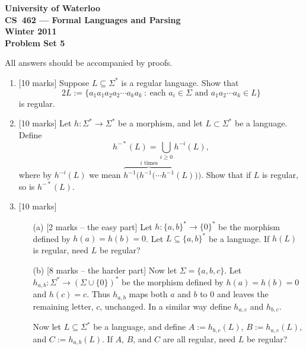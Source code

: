 \documentclass[12pt]{article}
\begin{document}
\begin{center}
\large\bf University of Waterloo\\
CS~462 --- Formal Languages and Parsing\\
Winter 2011\\
Problem Set 5\\
\end{center}

\bigskip


\smallskip


\bigskip\bigskip

All answers should be accompanied by proofs.

\begin{enumerate}

\item{} [10 marks]
Suppose $L \subseteq \Sigma^*$ is a regular language.  Show that
$$2L := \lbrace a_1 a_1 a_2 a_2 \cdots a_k a_k \ : \ 
\text{each $a_i \in \Sigma$ and $a_1 a_2 \cdots a_k \in L$} \rbrace$$
is regular.

\item{} [10 marks] Let $h: \Sigma^* \rightarrow \Sigma^*$ be a morphism,
and let $L \subset \Sigma^*$ be a language.  Define
$$h^{-*} (L) = \bigcup_{i \geq 0} h^{-i} (L),$$
where by $h^{-i}(L)$ we mean $\overbrace{h^{-1} ( h^{-1} ( \cdots h^{-1}}^{i
 \text{ times}} (L)))$.
Show that if $L$ is regular, so is $h^{-*} (L)$.

\item{} [10 marks]
\begin{itemize}
\item[(a)]  [2 marks -- the easy part]
Let $h: \lbrace a,b \rbrace^* \rightarrow \lbrace 0 \rbrace^*$
be the morphism defined by $h(a) = h(b) = 0$.
Let $L \subseteq \lbrace a,b \rbrace^*$ be a language.
If $h(L)$ is regular, need
$L$ be regular?  

\item[(b)]  [8 marks -- the harder part] Now let $\Sigma = \lbrace a,b, c \rbrace$.
Let $h_{a,b}: \Sigma^* \rightarrow (\Sigma \cup \lbrace 0 \rbrace)^*$ be the morphism
defined by $h(a) = h(b) = 0$ and $h(c) = c$.  
Thus $h_{a,b}$ maps both $a$ and $b$ to $0$ and leaves the remaining letter,
$c$, unchanged.  In a similar way define
$h_{a,c}$ and $h_{b,c}$.  
\medskip

Now let $L \subseteq \Sigma^* $ be a language, and define
$A := h_{b,c}(L)$, $B := h_{a,c}(L)$, and $C := h_{a, b}(L)$.
If $A$, $B$, and $C$ are all regular, need $L$ be regular?

\end{itemize}

\end{enumerate}
\end{document}
